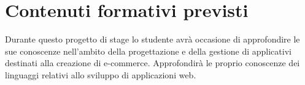 \section*{Contenuti formativi previsti}
Durante questo progetto di stage lo studente avrà occasione di approfondire le sue conoscenze nell'ambito della progettazione e della gestione di applicativi destinati alla creazione di e-commerce. Approfondirà le proprio conoscenze dei linguaggi relativi allo sviluppo di applicazioni web.
\newpage